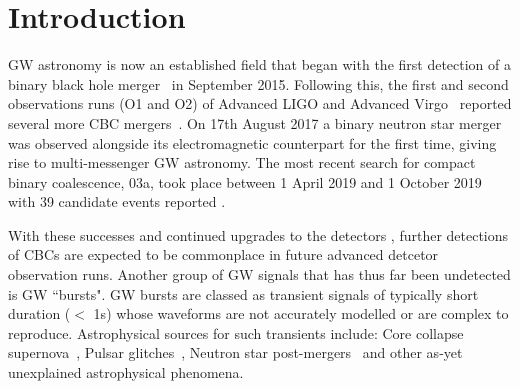 \documentclass[12pt]{iopart}
\begin{document}
\section{Introduction}

%
\ac{GW} astronomy is now an established field that began with the first
detection of a binary black hole merger~\cite{Abbott2016} in September 2015.
Following this, the first and second observations runs (O1 and O2) of Advanced
LIGO and Advanced Virgo~\cite{Prospects-dets, AdvLIGO, AdvLIGO2, AdvVIRGO}
reported several more \ac{CBC} mergers~\cite{Abbott2016a, Abbott2017,
Abbott2017a, Abbott2017b}. On 17th August 2017 a binary neutron star merger was
observed alongside its electromagnetic counterpart for the first time, giving
rise to multi-messenger \ac{GW} astronomy. The most recent search for compact binary coalescence, 03a, took place between 1 April 2019 and 1 October 2019 with 39 candidate events reported \cite{GWTC2:2020}.  

%
With these successes and continued upgrades to the detectors \cite{2018LRR....21....3A}, further
detections of \acp{CBC} are expected to be commonplace in future advanced
detcetor observation runs. Another group of \ac{GW} signals that has thus far
been undetected is \ac{GW} ``bursts". \ac{GW} bursts are classed as transient
signals of typically short duration ($<$ 1s) whose waveforms are not accurately
modelled or are complex to reproduce. Astrophysical sources for such transients
include: Core collapse supernova~\cite{Fryer_2003}, Pulsar
glitches~\cite{Andersson_2001}, Neutron star post-mergers~\cite{Baiotti_2007}
and other as-yet unexplained astrophysical phenomena. 
\end{document}
